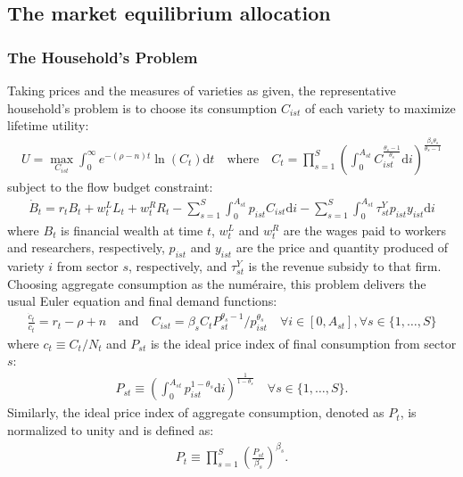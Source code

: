 \documentclass[12pt]{article}
\begin{document}
\clearpage

\subsection{The market equilibrium allocation}
\label{a:market equilibrium allocation}

\subsubsection{The Household's Problem}
\label{appendix:household problem}

Taking prices and the measures of varieties as given, the representative household's problem is to choose its consumption $C_{ist}$ of each variety to maximize lifetime utility:
\begin{align*}
U = \max_{C_{ist}} \int_0^{\infty} e^{-(\rho - n) t} \ln(C_t) \text{d}t \quad \text{where} \quad C_t = \prod_{s = 1}^S \left(\int_0^{A_{st}} C_{ist}^{\frac{\theta_s - 1}{\theta_s}} \text{d}i\right)^{\frac{\beta_s \theta_s}{\theta_s - 1}}
\end{align*}
subject to the flow budget constraint:
\begin{align*}
\dot{B}_t = r_t B_t + w_t^L L_t + w_t^R R_t - \sum_{s = 1}^S \int_0^{A_{st}} p_{ist} C_{ist} \text{d}i - \sum_{s = 1}^S \int_0^{A_{st}} \tau_{st}^Y p_{ist} y_{ist} \text{d}i
\end{align*}
where $B_t$ is financial wealth at time $t$, $w_t^L$ and $w_t^R$ are the wages paid to workers and researchers, respectively, $p_{ist}$ and $y_{ist}$ are the price and quantity produced of variety $i$ from sector $s$, respectively, and $\tau_{st}^Y$ is the revenue subsidy to that firm. Choosing aggregate consumption as the num\'eraire, this problem delivers the usual Euler equation and final demand functions:
\begin{align*}
\frac{\dot{c}_t}{c_t} = r_t - \rho + n \quad \text{and} \quad C_{ist} = \beta_s C_t P_{st}^{\theta_s - 1} / p_{ist}^{\theta_s}\quad \forall i \in [0, A_{st}], \forall s \in \{1, \ldots, S\}
\end{align*}
where $c_t \equiv C_t / N_t$ and $P_{st}$ is the ideal price index of final consumption from sector $s$:
\begin{align*}
P_{st} \equiv \left(\int_0^{A_{st}} p_{ist}^{1 - \theta_s} \text{d}i\right)^{\frac{1}{1 - \theta_s}} \quad \forall s \in \{1, \ldots, S\}.
\end{align*}
Similarly, the ideal price index of aggregate consumption, denoted as $P_t$, is normalized to unity and is defined as:
\begin{align*}
P_t \equiv \prod_{s = 1}^S \left(\frac{P_{st}}{\beta_s}\right)^{\beta_s}.
\end{align*}
\end{document}
